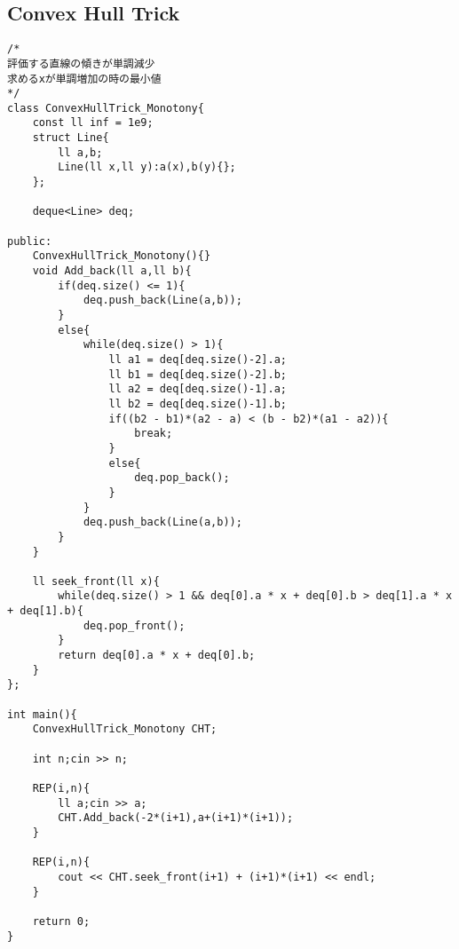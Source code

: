 \documentclass[10pt]{article}
\begin{document}
\subsection{Convex Hull Trick}
\begin{lstlisting}
/*
評価する直線の傾きが単調減少
求めるxが単調増加の時の最小値
*/
class ConvexHullTrick_Monotony{
	const ll inf = 1e9;
	struct Line{
		ll a,b;
		Line(ll x,ll y):a(x),b(y){};
	};

	deque<Line> deq;

public:
	ConvexHullTrick_Monotony(){}
	void Add_back(ll a,ll b){
		if(deq.size() <= 1){
			deq.push_back(Line(a,b));
		}
		else{
			while(deq.size() > 1){
				ll a1 = deq[deq.size()-2].a;
				ll b1 = deq[deq.size()-2].b;
				ll a2 = deq[deq.size()-1].a;
				ll b2 = deq[deq.size()-1].b;
				if((b2 - b1)*(a2 - a) < (b - b2)*(a1 - a2)){
					break;
				}
				else{
					deq.pop_back();
				}
			}
			deq.push_back(Line(a,b));
		}
	}

	ll seek_front(ll x){
		while(deq.size() > 1 && deq[0].a * x + deq[0].b > deq[1].a * x + deq[1].b){
			deq.pop_front();
		}
		return deq[0].a * x + deq[0].b;
	}
};

int main(){
	ConvexHullTrick_Monotony CHT;

	int n;cin >> n;

	REP(i,n){
		ll a;cin >> a;
		CHT.Add_back(-2*(i+1),a+(i+1)*(i+1));
	}

	REP(i,n){
		cout << CHT.seek_front(i+1) + (i+1)*(i+1) << endl;
	}

	return 0;
}
\end{lstlisting}
\end{document}
